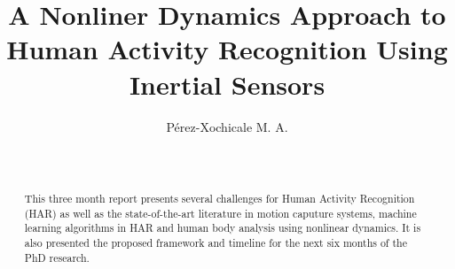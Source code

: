 \documentclass{sigchi}
\begin{document}
\title{A Nonliner Dynamics Approach to Human Activity Recognition Using
Inertial Sensors}

\author{
  \alignauthor P\'erez-Xochicale M. A.\\
    \\
    \\
}

\maketitle

\begin{abstract}
This three month report presents several challenges for Human Activity Recognition (HAR)
as well as the state-of-the-art literature in motion caputure systems, machine learning 
algorithms in HAR and human body analysis using nonlinear dynamics.
It is also presented the proposed framework and timeline for the next six months
of the PhD research.
% 



\end{abstract}
\end{document}
